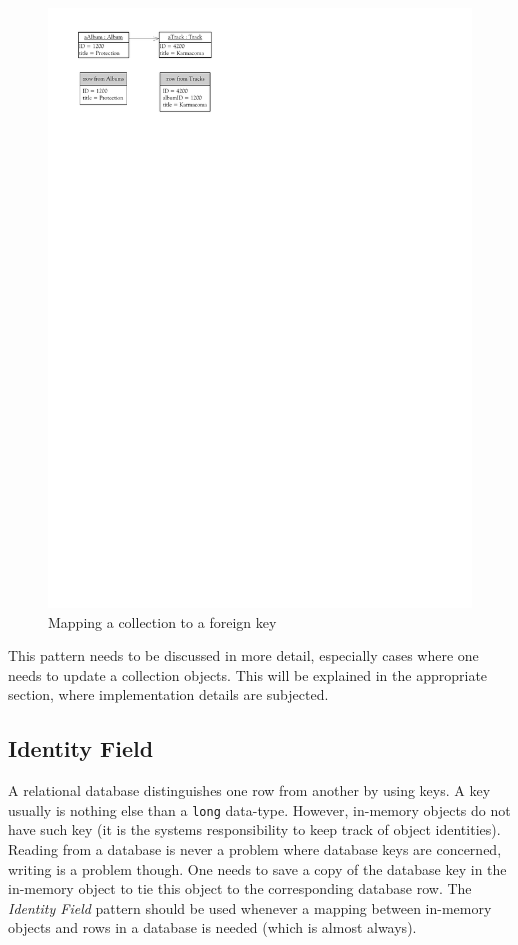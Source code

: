 			\begin{figure}[htb]
				\begin{center}
					\includegraphics{./files/inc/figures/patternsForeignKeyMapping2}
					\caption{\label{fig:patternsForeignKeyMapping2} Mapping a collection to a foreign key}
				\end{center}
			\end{figure}
			This pattern needs to be discussed in more detail, especially cases where one needs
			to update a collection objects. This will be explained in the appropriate section, where
			implementation details are subjected.
			
		\subsection{Identity Field}
		\label{subsec:identityField}
			A relational database distinguishes one row from another by using keys. A key usually
			is nothing else than a \verb~long~ data-type. However, in-memory objects do not have such 
			key (it is the systems responsibility to keep track of object identities). Reading from a
			database is never a problem where database keys are concerned, writing is a problem though.
			One needs to save a copy of the database key in the in-memory object to tie this object to
			the corresponding database row. The \textit{Identity Field} pattern should be used whenever a mapping between
			in-memory objects and rows in a database is needed (which is almost always).
			

